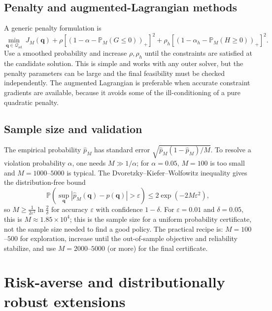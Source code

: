 \documentclass[11pt]{article}
\numberwithin{equation}{section}
\newcommand{\Prob}{\mathbb{P}}
\newcommand{\abs}[1]{\left\lvert #1 \right\rvert}
\newcommand{\qq}{\mathbf{q}}
\theoremstyle{plain}
\begin{document}
\subsection{Penalty and augmented-Lagrangian methods}

A generic penalty formulation is
\begin{equation}
\label{eq:penalty}
\min_{\qq\in\mathcal{Q}_{\mathrm{ad}}}\
J_M(\qq)
+\rho\left[\left(1-\alpha-\Prob_M(G\le0)\right)_+\right]^2
+\rho_h\left[\left(1-\alpha_h-\Prob_M(H\ge0)\right)_+\right]^2.
\end{equation}
Use a smoothed probability and increase $\rho,\rho_h$ until the constraints
are satisfied at the candidate solution.  This is simple and works with any
outer solver, but the penalty parameters can be large and the final
feasibility must be checked independently.  The augmented Lagrangian is
preferable when accurate constraint gradients are available, because it avoids
some of the ill-conditioning of a pure quadratic penalty.

\subsection{Sample size and validation}

The empirical probability $\hat p_M$ has standard error
$\sqrt{\hat p_M(1-\hat p_M)/M}$.  To resolve a violation probability
$\alpha$, one needs $M\gg1/\alpha$; for $\alpha=0.05$, $M=100$ is too small
and $M=1000$--$5000$ is typical.  The Dvoretzky--Kiefer--Wolfowitz inequality
gives the distribution-free bound
\begin{equation}
\label{eq:dkw}
\Prob\left(\sup_{\qq}\abs{\hat p_M(\qq)-p(\qq)}>\varepsilon\right)
\le2\exp(-2M\varepsilon^2),
\end{equation}
so $M\ge\frac{1}{2\varepsilon^2}\ln\frac{2}{\delta}$ for accuracy
$\varepsilon$ with confidence $1-\delta$.  For $\varepsilon=0.01$ and
$\delta=0.05$, this is $M\approx1.85\times10^4$; this is the sample size for a
uniform probability certificate, not the sample size needed to find a good
policy.  The practical recipe is: $M=100$--$500$ for exploration, increase
until the out-of-sample objective and reliability stabilize, and use
$M=2000$--$5000$ (or more) for the final certificate.

\section{Risk-averse and distributionally robust extensions}
\label{sec:risk}
\end{document}
